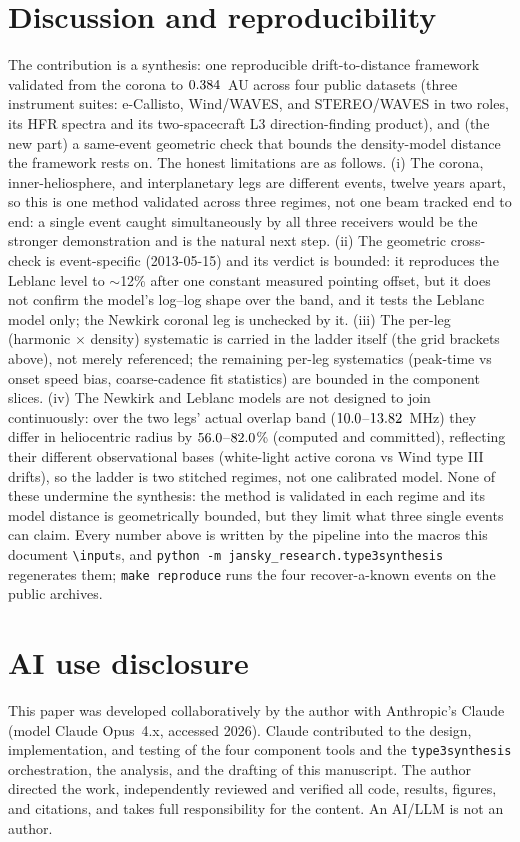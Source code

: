\documentclass[twocolumn]{aastex631}
\newcommand{\code}[1]{\texttt{#1}}
\begin{document}
\section{Discussion and reproducibility}
The contribution is a synthesis: one reproducible drift-to-distance framework validated from the
corona to $0.384$~AU across four public datasets (three instrument suites:
e-Callisto, Wind/WAVES, and STEREO/WAVES in two roles, its HFR spectra and its two-spacecraft
L3 direction-finding product), and (the new part) a same-event geometric check that bounds the
density-model distance the framework rests on. The honest limitations are as follows. (i) The
corona, inner-heliosphere, and interplanetary legs are different events, twelve years apart, so
this is one method validated across three regimes, not one beam tracked end to end: a single
event caught simultaneously by all three receivers would be the stronger demonstration and is
the natural next step. (ii) The geometric cross-check is event-specific (2013-05-15) and its
verdict is bounded: it reproduces the Leblanc level to $\sim$12\% after one constant
measured pointing offset, but it does not confirm the model's log--log shape over the band, and
it tests the Leblanc model only; the Newkirk coronal leg is unchecked by it. (iii) The
per-leg (harmonic $\times$ density) systematic is carried in the ladder itself (the grid
brackets above), not merely referenced; the remaining per-leg systematics (peak-time vs onset
speed bias, coarse-cadence fit statistics) are bounded in the component slices. (iv) The
Newkirk and Leblanc models are not designed to join continuously: over the two legs' actual
overlap band ($10.0$--$13.82$~MHz) they differ in heliocentric
radius by $56.0$--$82.0$\% (computed and committed),
reflecting their different observational bases (white-light active corona vs Wind type III
drifts), so the ladder is two stitched regimes, not one calibrated model. None of these
undermine the synthesis: the method is validated in each regime and its model distance is
geometrically bounded, but they limit what three single events can claim. Every number above is written by the pipeline into the macros this document
\code{\textbackslash input}s, and \code{python -m jansky\_research.type3synthesis} regenerates them;
\code{make reproduce} runs the four recover-a-known events on the public archives.

\section*{AI use disclosure}
This paper was developed collaboratively by the author with Anthropic's Claude
\citep{anthropicclaude} (model Claude Opus~4.x, accessed 2026). Claude contributed to the design,
implementation, and testing of the four component tools and the \code{type3synthesis} orchestration,
the analysis, and the drafting of this manuscript. The author directed the work, independently reviewed
and verified all code, results, figures, and citations, and takes full responsibility for the content.
An AI/LLM is not an author.
\end{document}
